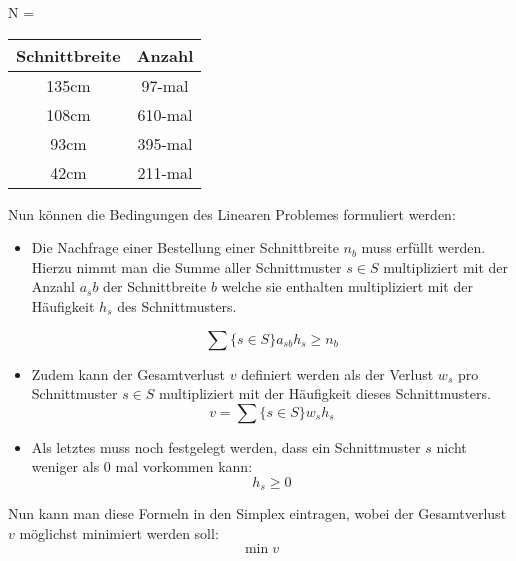 \begin{itemize}
\begin{itemize}
N = \begin{tabular}{|c|c|}
\hline Schnittbreite & Anzahl \\
\hline 135cm & 97-mal \\ 
\hline 108cm & 610-mal \\ 
\hline 93cm & 395-mal \\ 
\hline 42cm & 211-mal \\ 
\hline 
\end{tabular} 
\end{itemize}
\end{itemize}

Nun können die Bedingungen des Linearen Problemes formuliert werden:

\begin{itemize}
\item Die Nachfrage einer Bestellung einer Schnittbreite $n_b$ muss erfüllt werden. Hierzu nimmt man die Summe aller Schnittmuster $s \in S$ multipliziert mit der Anzahl $a_sb$ der Schnittbreite $b$ welche sie enthalten multipliziert mit der Häufigkeit $h_s$ des Schnittmusters.

\[ \sum\{s \in S\}a_{sb} h_s \geq n_b \]
\item Zudem kann der Gesamtverlust $v$ definiert werden als der Verlust $w_s$ pro Schnittmuster $s \in S$ multipliziert mit der Häufigkeit dieses Schnittmusters.
\[ v = \sum\{s \in S\}w_s h_s  \] 
\item Als letztes muss noch festgelegt werden, dass ein Schnittmuster $s$ nicht weniger als 0 mal vorkommen kann:
\[ h_s \geq 0 \]
\end{itemize}

Nun kann man diese Formeln in den Simplex eintragen, wobei der Gesamtverlust $v$ möglichst minimiert werden soll: 
\[ \min v \] 